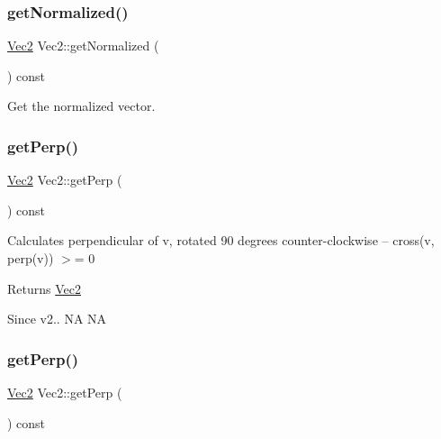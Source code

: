 \subsubsection{\texorpdfstring{get\+Normalized()}{getNormalized()}\hspace{0.1cm}{\footnotesize\ttfamily [2/2]}}
{\footnotesize\ttfamily \hyperlink{classVec2}{Vec2} Vec2\+::get\+Normalized (\begin{DoxyParamCaption}{ }\end{DoxyParamCaption}) const}

Get the normalized vector. \mbox{\label{classVec2_a0b6b1c97713d11486dc898aa203f1a72}} 
\subsubsection{\texorpdfstring{get\+Perp()}{getPerp()}\hspace{0.1cm}{\footnotesize\ttfamily [1/2]}}
{\footnotesize\ttfamily \hyperlink{classVec2}{Vec2} Vec2\+::get\+Perp (\begin{DoxyParamCaption}{ }\end{DoxyParamCaption}) const\hspace{0.3cm}{\ttfamily [inline]}}

Calculates perpendicular of v, rotated 90 degrees counter-\/clockwise -- cross(v, perp(v)) $>$= 0 \begin{DoxyReturn}{Returns}
\hyperlink{classVec2}{Vec2} 
\end{DoxyReturn}
\begin{DoxySince}{Since}
v2..  NA  NA 
\end{DoxySince}
\mbox{\label{classVec2_a0b6b1c97713d11486dc898aa203f1a72}} 
\subsubsection{\texorpdfstring{get\+Perp()}{getPerp()}\hspace{0.1cm}{\footnotesize\ttfamily [2/2]}}
{\footnotesize\ttfamily \hyperlink{classVec2}{Vec2} Vec2\+::get\+Perp (\begin{DoxyParamCaption}{ }\end{DoxyParamCaption}) const\hspace{0.3cm}{\ttfamily [inline]}}

